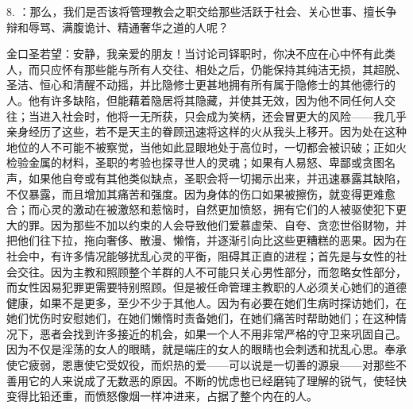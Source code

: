 8. ：那么，我们是否该将管理教会之职交给那些活跃于社会、关心世事、擅长争辩和辱骂、满腹诡计、精通奢华之道的人呢？\par

金口圣若望：安静，我亲爱的朋友！当讨论司铎职时，你决不应在心中怀有此类人，而只应怀有那些能与所有人交往、相处之后，仍能保持其纯洁无损，其超脱、圣洁、恒心和清醒不动摇，并比隐修士更甚地拥有所有属于隐修士的其他德行的人。他有许多缺陷，但能藉着隐居将其隐藏，并使其无效，因为他不同任何人交往；当进入社会时，他将一无所获，只会成为笑柄，还会冒更大的风险——我几乎亲身经历了这些，若不是天主的眷顾迅速将这样的火从我头上移开。因为处在这种地位的人不可能不被察觉，当他如此显眼地处于高位时，一切都会被识破；正如火检验金属的材料，圣职的考验也探寻世人的灵魂；如果有人易怒、卑鄙或贪图名声，如果他自夸或有其他类似缺点，圣职会将一切揭示出来，并迅速暴露其缺陷，不仅暴露，而且增加其痛苦和强度。因为身体的伤口如果被擦伤，就变得更难愈合；而心灵的激动在被激怒和惹恼时，自然更加愤怒，拥有它们的人被驱使犯下更大的罪。因为那些不加以约束的人会导致他们爱慕虚荣、自夸、贪恋世俗财物，并把他们往下拉，拖向奢侈、散漫、懒惰，并逐渐引向比这些更糟糕的恶果。因为在社会中，有许多情况能够扰乱心灵的平衡，阻碍其正直的进程；首先是与女性的社会交往。因为主教和照顾整个羊群的人不可能只关心男性部分，而忽略女性部分，而女性因易犯罪更需要特别照顾。但是被任命管理主教职的人必须关心她们的道德健康，如果不是更多，至少不少于其他人。因为有必要在她们生病时探访她们，在她们忧伤时安慰她们，在她们懒惰时责备她们，在她们痛苦时帮助她们；在这种情况下，恶者会找到许多接近的机会，如果一个人不用非常严格的守卫来巩固自己。因为不仅是淫荡的女人的眼睛，就是端庄的女人的眼睛也会刺透和扰乱心思。奉承使它疲弱，恩惠使它受奴役，而炽热的爱——可以说是一切善的源泉——对那些不善用它的人来说成了无数恶的原因。不断的忧虑也已经磨钝了理解的锐气，使轻快变得比铅还重，而愤怒像烟一样冲进来，占据了整个内在的人。\par

